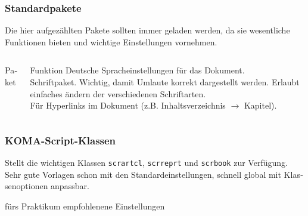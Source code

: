\begin{frame}[fragile]
    \frametitle{Standardpakete}
    Die hier aufgezählten Pakete sollten immer geladen werden, da sie wesentliche Funktionen bieten und wichtige Einstellungen vornehmen.
    \begin{columns}[T]
        \begin{column}{0.47\textwidth}
            \begin{block}{Paket}
                \begin{lstverbatim}
                \usepackage{polyglossia}
                \setmainlanguage{german}
                \usepackage{fontspec}



                \usepackage[unicode, pdfusetitle]{hyperref}
                \end{lstverbatim}
            \end{block}
        \end{column}
        \begin{column}{0.47\textwidth}
            \begin{block}{Funktion}
                Deutsche Spracheinstellungen für das Dokument. \\
                Schriftpaket. Wichtig, damit Umlaute korrekt dargestellt werden.
                Erlaubt einfaches ändern der verschiedenen Schriftarten.\\
                Für Hyperlinks im Dokument (z.B. Inhaltsverzeichnis $\rightarrow$ Kapitel).
            \end{block}
        \end{column}
    \end{columns}
\end{frame}

\begin{frame}[fragile]
    \frametitle{KOMA-Script-Klassen \hfill {}}
    Stellt die wichtigen Klassen \texttt{scrartcl}, \texttt{scrreprt} und \texttt{scrbook} zur Verfügung. Sehr gute Vorlagen schon mit den Standardeinstellungen, schnell global mit Klassenoptionen anpassbar.
    \begin{block}{fürs Praktikum empfohlenene Einstellungen}
    \end{block}
\end{frame}

